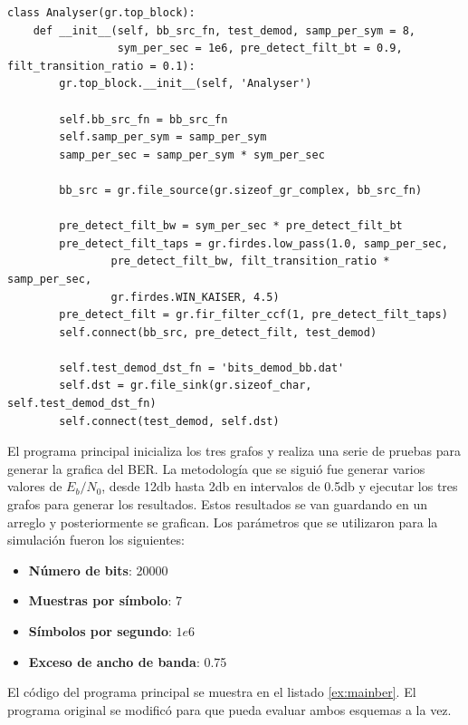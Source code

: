 \begin{lstlisting}[float, label=ex:analizer, caption={C\'odigo que implementa el grafo demodulador
para el analisis del BER.}, breaklines=true]
class Analyser(gr.top_block):
    def __init__(self, bb_src_fn, test_demod, samp_per_sym = 8,
                 sym_per_sec = 1e6, pre_detect_filt_bt = 0.9, filt_transition_ratio = 0.1):
        gr.top_block.__init__(self, 'Analyser')

        self.bb_src_fn = bb_src_fn
        self.samp_per_sym = samp_per_sym
        samp_per_sec = samp_per_sym * sym_per_sec

        bb_src = gr.file_source(gr.sizeof_gr_complex, bb_src_fn)

        pre_detect_filt_bw = sym_per_sec * pre_detect_filt_bt
        pre_detect_filt_taps = gr.firdes.low_pass(1.0, samp_per_sec,
                pre_detect_filt_bw, filt_transition_ratio * samp_per_sec,
                gr.firdes.WIN_KAISER, 4.5)
        pre_detect_filt = gr.fir_filter_ccf(1, pre_detect_filt_taps)
        self.connect(bb_src, pre_detect_filt, test_demod)

        self.test_demod_dst_fn = 'bits_demod_bb.dat'
        self.dst = gr.file_sink(gr.sizeof_char, self.test_demod_dst_fn)
        self.connect(test_demod, self.dst)
\end{lstlisting}

El programa principal inicializa los tres grafos y realiza una serie de pruebas para generar la
grafica del BER. La metodolog\'ia que se sigui\'o fue generar varios valores de $E_b/N_0$, desde
12db hasta 2db en intervalos de 0.5db y ejecutar los tres grafos para generar los resultados. Estos
resultados se van guardando en un arreglo y posteriormente se grafican. Los par\'ametros que se
utilizaron para la simulaci\'on fueron los siguientes:

\begin{itemize}
  \item \textbf{N\'umero de bits}: 20000
  \item \textbf{Muestras por s\'imbolo}: 7
  \item \textbf{S\'imbolos por segundo}: $1e6$
  \item \textbf{Exceso de ancho de banda}: 0.75
\end{itemize}

El c\'odigo del programa principal se muestra en el listado \ref{ex:mainber}. El programa original
se modific\'o para que pueda evaluar ambos esquemas a la vez.


